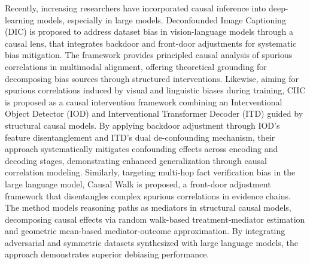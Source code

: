 Recently, increasing researchers have incorporated causal inference into deep-learning models, especially in large models. Deconfounded Image Captioning (DIC) \cite{yangDeconfoundedImageCaptioning2023} is proposed to address dataset bias in vision-language models through a causal lens, that integrates backdoor and front-door adjustments for systematic bias mitigation. The framework provides principled causal analysis of spurious correlations in multimodal alignment, offering theoretical grounding for decomposing bias sources through structured interventions. Likewise, aiming for spurious correlations induced by visual and linguistic biases during training, CIIC \cite{liuShowDeconfoundTell2022} is proposed as a causal intervention framework combining an Interventional Object Detector (IOD) and Interventional Transformer Decoder (ITD) guided by structural causal models. By applying backdoor adjustment through IOD's feature disentanglement and ITD's dual de-confounding mechanism, their approach systematically mitigates confounding effects across encoding and decoding stages, demonstrating enhanced generalization through causal correlation modeling. Similarly, targeting multi-hop fact verification bias in the large language model, Causal Walk \cite{zhangCausalWalkDebiasing2024} is proposed, a front-door adjustment framework that disentangles complex spurious correlations in evidence chains. 
The method models reasoning paths as mediators in structural causal models, decomposing causal effects via random walk-based treatment-mediator estimation and geometric mean-based mediator-outcome approximation. By integrating adversarial and symmetric datasets synthesized with large language models, the approach demonstrates superior debiasing performance. 

